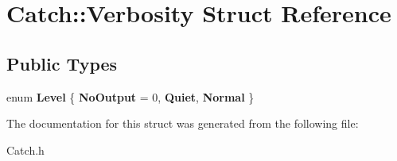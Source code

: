 \hypertarget{struct_catch_1_1_verbosity}{\section{Catch\-:\-:Verbosity Struct Reference}
\label{struct_catch_1_1_verbosity}
}
\subsection*{Public Types}
\begin{DoxyCompactItemize}
\item 
enum {\bfseries Level} \{ {\bfseries No\-Output} = 0, 
{\bfseries Quiet}, 
{\bfseries Normal}
 \}
\end{DoxyCompactItemize}


The documentation for this struct was generated from the following file\-:\begin{DoxyCompactItemize}
\item 
Catch.\-h\end{DoxyCompactItemize}
